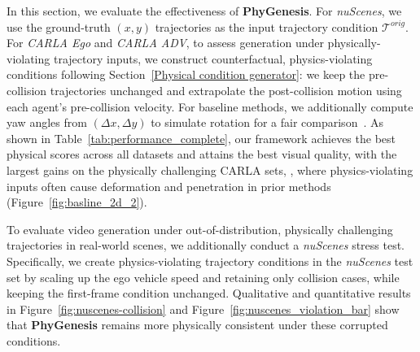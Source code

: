 \documentclass[runningheads]{llncs}
\begin{document}

In this section, we evaluate the effectiveness of \textbf{PhyGenesis}. For \textit{nuScenes}, we use the ground-truth $(x,y)$ trajectories as the input trajectory condition $\mathcal{T}^{orig}$. For \textit{CARLA Ego} and \textit{CARLA ADV}, to assess generation under physically-violating trajectory inputs, we construct counterfactual, physics-violating conditions following Section~\ref{Physical condition generator}: we keep the pre-collision trajectories unchanged and extrapolate the post-collision motion using each agent's pre-collision velocity. For baseline methods, we additionally compute yaw angles from $(\Delta x,\Delta y)$ to simulate rotation for a fair comparison~\cite{liao2025diffusiondrive}. As shown in Table~\ref{tab:performance_complete}, our framework achieves the best physical scores across all datasets and attains the best visual quality, with the largest gains on the physically challenging CARLA sets, , where physics-violating inputs often cause deformation and penetration in prior methods (Figure~\ref{fig:basline_2d_2}).

To evaluate video generation under out-of-distribution, physically challenging trajectories in real-world scenes, we additionally conduct a \textit{nuScenes} stress test. Specifically, we create physics-violating trajectory conditions in the \textit{nuScenes} test set by scaling up the ego vehicle speed and retaining only collision cases, while keeping the first-frame condition unchanged. Qualitative and quantitative results in Figure~\ref{fig:nuscenes-collision} and Figure~\ref{fig:nuscenes_violation_bar} show that \textbf{PhyGenesis} remains more physically consistent under these corrupted conditions.
\end{document}
